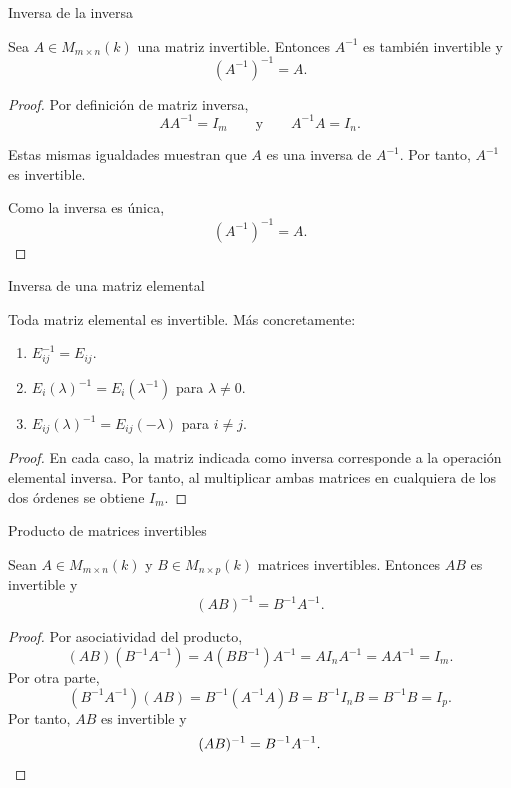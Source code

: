 \begin{frame}{Inversa de la inversa}

\begin{proposition}
Sea \(A\in M_{m\times n}(k)\) una matriz invertible. Entonces
\(A^{-1}\) es también invertible y
\[
\left(A^{-1}\right)^{-1}=A.
\]
\end{proposition}

\begin{proof}
Por definición de matriz inversa,
\[
AA^{-1}=I_m
\qquad\text{y}\qquad
A^{-1}A=I_n.
\]

Estas mismas igualdades muestran que \(A\) es una inversa de
\(A^{-1}\). Por tanto, \(A^{-1}\) es invertible.

Como la inversa es única,
\[
\left(A^{-1}\right)^{-1}=A.
\]
\end{proof}

\end{frame}


\begin{frame}{Inversa de una matriz elemental}

\begin{proposition}
Toda matriz elemental es invertible. Más concretamente:

\begin{enumerate}
    \item \(E_{ij}^{-1}=E_{ij}\).

    \item
    \(E_i(\lambda)^{-1}=E_i(\lambda^{-1})\) para \(\lambda\neq0\).

    \item 
    \(E_{ij}(\lambda)^{-1}=E_{ij}(-\lambda)\) para \(i\neq j\).
\end{enumerate}
\end{proposition}

\begin{proof}
En cada caso, la matriz indicada como inversa corresponde a la
operación elemental inversa. Por tanto, al multiplicar ambas matrices
en cualquiera de los dos órdenes se obtiene \(I_m\).
\end{proof}

\end{frame}

\begin{frame}{Producto de matrices invertibles}

\begin{proposition}
Sean \(A\in M_{m\times n}(k)\) y \(B\in M_{n\times p}(k)\)
matrices invertibles. Entonces \(AB\) es invertible y
\[
(AB)^{-1}=B^{-1}A^{-1}.
\]
\end{proposition}
\begin{proof}
Por asociatividad del producto,
\[
(AB)(B^{-1}A^{-1})
=A(BB^{-1})A^{-1}
=AI_nA^{-1}
=AA^{-1}
=I_m.
\]
Por otra parte,
\[
(B^{-1}A^{-1})(AB)
=B^{-1}(A^{-1}A)B
=B^{-1}I_nB
=B^{-1}B
=I_p.
\]
Por tanto, \(AB\) es invertible y
\[
(AB)^{-1}=B^{-1}A^{-1}.\qedhere
\]
\end{proof}

\end{frame}

